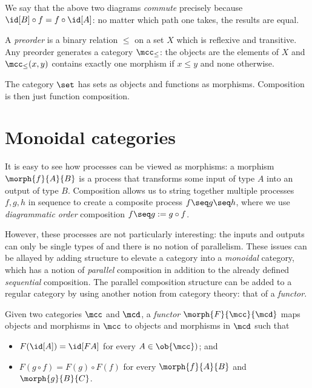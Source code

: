 \begin{center}
    
    \quad
    
\end{center}

We say that the above two diagrams \emph{commute} precisely because \(
    \id[B] \circ f = f \circ \id[A]
\): no matter which path one takes, the results are equal.

\begin{example}[Preorder]
    A \emph{preorder} is a binary relation \(\leq\) on a set \(X\) which is
    reflexive and transitive.
    Any preorder generates a category \(\mcc_\leq\): the objects are the
    elements of \(X\) and \(\mcc_\leq(x, y)\) contains exactly one morphism if
    \(x \leq y\) and none otherwise.
\end{example}

\begin{example}
    The category \(\set\) has sets as objects and functions as morphisms.
    Composition is then just function composition.
\end{example}

\section{Monoidal categories}

It is easy to see how processes can be viewed as morphisms: a morphism
\(\morph{f}{A}{B}\) is a process that transforms some input of type \(A\) into
an output of type \(B\).
Composition allows us to string together multiple processes \(f, g, h\) in
sequence to create a composite process \(f \seq g \seq h\), where we use
\emph{diagrammatic order} composition \(f \seq g := g \circ f\).

However, these processes are not particularly interesting: the inputs and
outputs can only be single types of and there is no notion of parallelism.
These issues can be allayed by adding structure to elevate a category into a
\emph{monoidal} category, which has a notion of \emph{parallel} composition in
addition to the already defined \emph{sequential} composition.
The parallel composition structure can be added to a regular category by using
another notion from category theory: that of a \emph{functor}.

\begin{definition}[Functor]
    Given two categories \(\mcc\) and \(\mcd\), a \emph{functor} \(
        \morph{F}{\mcc}{\mcd}
    \) maps objects and morphisms in \(\mcc\) to objects and morphisms in
    \(\mcd\) such that
    \begin{itemize}
        \item \(F(\id[A]) = \id[FA]\) for every \(A \in \ob{\mcc})\); and
        \item \(F(g \circ f) = F(g) \circ F(f)\) for every \(\morph{f}{A}{B}\)
        and \(\morph{g}{B}{C}\).
    \end{itemize}
\end{definition}

